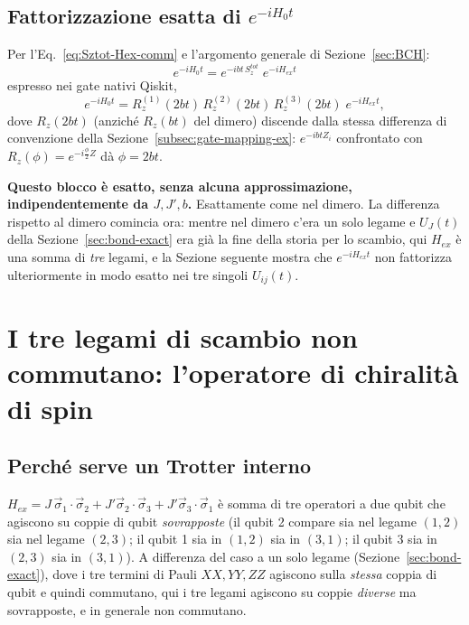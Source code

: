 \documentclass[11pt,a4paper]{article}
\begin{document}
\subsection{Fattorizzazione esatta di $e^{-iH_0t}$}

Per l'Eq.~\eqref{eq:Sztot-Hex-comm} e l'argomento generale di Sezione~\ref{sec:BCH}:
\begin{equation}
\boxed{e^{-iH_0t} = e^{-ibt\,S_z^{tot}}\; e^{-iH_{ex}t}}
\label{eq:H0-factor}
\end{equation}
espresso nei gate nativi Qiskit,
\begin{equation}
e^{-iH_0t} = R_z^{(1)}(2bt)\,R_z^{(2)}(2bt)\,R_z^{(3)}(2bt)\;e^{-iH_{ex}t},
\label{eq:H0-factor-gates}
\end{equation}
dove $R_z(2bt)$ (anziché $R_z(bt)$ del dimero) discende dalla stessa differenza di convenzione della Sezione~\ref{subsec:gate-mapping-ex}: $e^{-ibtZ_i}$ confrontato con $R_z(\phi)=e^{-i\frac\phi2 Z}$ dà $\phi=2bt$.

\textbf{Questo blocco è esatto, senza alcuna approssimazione, indipendentemente da $J,J',b$.} Esattamente come nel dimero. La differenza rispetto al dimero comincia ora: mentre nel dimero c'era un solo legame e $U_J(t)$ della Sezione~\ref{sec:bond-exact} era già la fine della storia per lo scambio, qui $H_{ex}$ è una somma di \emph{tre} legami, e la Sezione seguente mostra che $e^{-iH_{ex}t}$ non fattorizza ulteriormente in modo esatto nei tre singoli $U_{ij}(t)$.

\section{I tre legami di scambio non commutano: l'operatore di chiralità di spin}
\label{sec:chirality}

\subsection{Perché serve un Trotter interno}

$H_{ex}=J\,\vec\sigma_1\!\cdot\!\vec\sigma_2+J'\vec\sigma_2\!\cdot\!\vec\sigma_3+J'\vec\sigma_3\!\cdot\!\vec\sigma_1$ è somma di tre operatori a due qubit che agiscono su coppie di qubit \emph{sovrapposte} (il qubit 2 compare sia nel legame $(1,2)$ sia nel legame $(2,3)$; il qubit 1 sia in $(1,2)$ sia in $(3,1)$; il qubit 3 sia in $(2,3)$ sia in $(3,1)$). A differenza del caso a un solo legame (Sezione~\ref{sec:bond-exact}), dove i tre termini di Pauli $XX,YY,ZZ$ agiscono sulla \emph{stessa} coppia di qubit e quindi commutano, qui i tre legami agiscono su coppie \emph{diverse} ma sovrapposte, e in generale non commutano.
\end{document}
